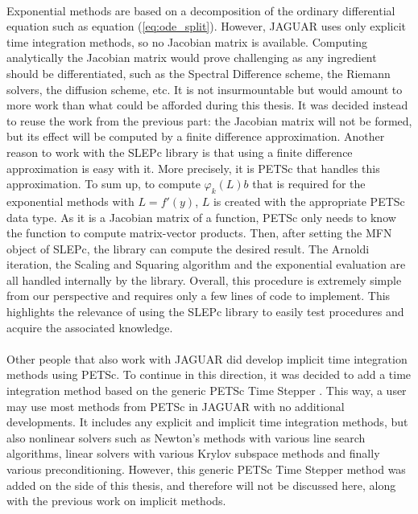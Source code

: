       \paragraph{}
      Exponential methods are based on a decomposition of the ordinary differential equation such as equation (\ref{eq:ode_split}).
      However, JAGUAR uses only explicit time integration methods, so no Jacobian matrix is available.
      Computing analytically the Jacobian matrix would prove challenging as any ingredient should be differentiated, such as the Spectral Difference scheme, the Riemann solvers, the diffusion scheme, etc.
      It is not insurmountable but would amount to more work than what could be afforded during this thesis.
      It was decided instead to reuse the work from the previous part: the Jacobian matrix will not be formed, but its effect will be computed by a finite difference approximation.
      Another reason to work with the SLEPc library is that using a finite difference approximation is easy with it.
      More precisely, it is PETSc that handles this approximation.
      To sum up, to compute $\varphi_k\left(L\right)b$ that is required for the exponential methods with $L = f'\left(y\right)$, $L$ is created with the appropriate PETSc data type.
      As it is a Jacobian matrix of a function, PETSc only needs to know the function to compute matrix-vector products.
      Then, after setting the MFN object of SLEPc, the library can compute the desired result.
      The Arnoldi iteration, the Scaling and Squaring algorithm and the exponential evaluation are all handled internally by the library.
      Overall, this procedure is extremely simple from our perspective and requires only a few lines of code to implement.
      This highlights the relevance of using the SLEPc library to easily test procedures and acquire the associated knowledge.

      \paragraph{}
      Other people that also work with JAGUAR did develop implicit time integration methods using PETSc.
      To continue in this direction, it was decided to add a time integration method based on the generic PETSc Time Stepper \cite{AbhyankarBrownConstantinescuEtAl2018}.
      This way, a user may use most methods from PETSc in JAGUAR with no additional developments.
      It includes any explicit and implicit time integration methods, but also nonlinear solvers such as Newton's methods with various line search algorithms, linear solvers with various Krylov subspace methods and finally various preconditioning.
      However, this generic PETSc Time Stepper method was added on the side of this thesis, and therefore will not be discussed here, along with the previous work on implicit methods.


